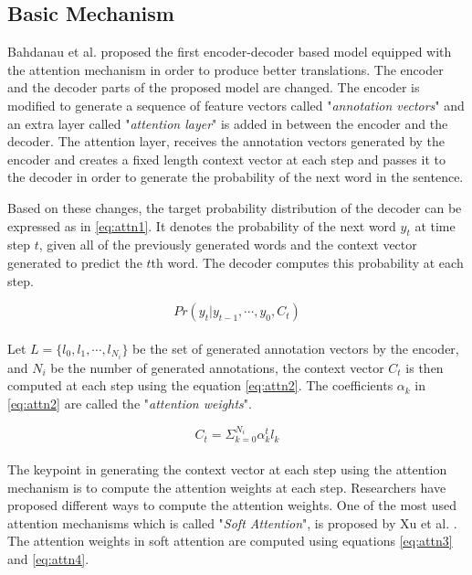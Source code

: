 \documentclass[preprint, 12pt]{elsarticle}
\begin{document}
		\subsection{Basic Mechanism}
		Bahdanau et al. \cite{bahdanau2014neural} proposed the first encoder-decoder based model equipped with the attention mechanism in order to produce better translations. The encoder and the decoder parts of the proposed model are changed. The encoder is modified to generate a sequence of feature vectors called "\textit{annotation vectors}" and an extra layer called "\textit{attention layer}" is added in between the encoder and the decoder. The attention layer, receives the annotation vectors generated by the encoder and creates a fixed length context vector at each step and passes it to the decoder in order to generate the probability of the next word in the sentence.
		
		Based on these changes, the target probability distribution of the decoder can be expressed as in \eqref{eq:attn1}. It denotes the probability of the next word $y_t$ at time step $t$, given all of the previously generated words and the context vector generated to predict the $t$th word. The decoder computes this probability at each step.
		
		\begin{equation}
			Pr(y_t | y_{t-1}, \cdots, y_0 , C_t)
			\label{eq:attn1}
		\end{equation}
		\\
		Let $L = \{l_0, l_1, \cdots, l_{N_i}\}$ be the set of generated annotation vectors by the encoder, and $N_i$ be the number of generated annotations, the context vector $C_t$ is then computed at each step using the equation \eqref{eq:attn2}. The coefficients $\alpha_k$ in \eqref{eq:attn2} are called the "\textit{attention weights}".
		
		\begin{equation}
			C_t = \Sigma_{k=0}^{N_i} \alpha_k^t l_k
			\label{eq:attn2}
		\end{equation}
		\\
		The keypoint in generating the context vector at each step using the attention mechanism is to compute the attention weights at each step. Researchers have proposed different ways to compute the attention weights. One of the most used attention mechanisms which is called "\textit{Soft Attention}", is proposed by Xu et al. \cite{xu2015show}. The attention weights in soft attention are computed using equations \eqref{eq:attn3} and \eqref{eq:attn4}.
		
\end{document}
